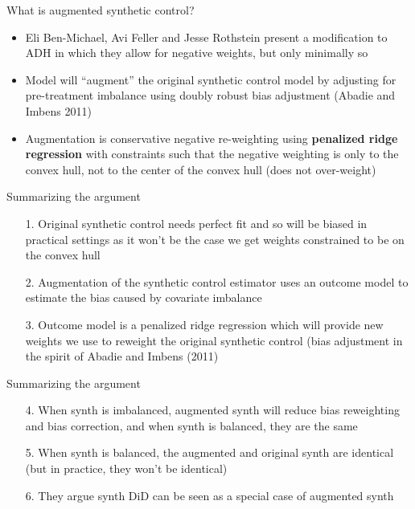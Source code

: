\documentclass{beamer}
\begin{document}
\begin{frame}{What is augmented synthetic control?}

\begin{itemize}
\item Eli Ben-Michael, Avi Feller and Jesse Rothstein present a modification to ADH in which they allow for negative weights, but only minimally so
\item Model will ``augment'' the original synthetic control model by adjusting for pre-treatment imbalance using doubly robust bias adjustment (Abadie and Imbens 2011)
\item Augmentation is conservative negative re-weighting using \textbf{penalized ridge regression} with constraints such that the negative weighting is only to the convex hull, not to the center of the convex hull (does not over-weight)
\end{itemize}

\end{frame}




\begin{frame}{Summarizing the argument}

\begin{enumerate}
\item[1. ] Original synthetic control needs perfect fit and so will be biased in practical settings as it won't be the case we get weights constrained to be  on the convex hull
\item[2. ] Augmentation of the synthetic control estimator uses an outcome model to estimate the bias caused by covariate imbalance 
\item[3. ] Outcome model is a penalized ridge regression which will provide new weights we use to reweight the original synthetic control (bias adjustment in the spirit of Abadie and Imbens (2011)
\end{enumerate}

\end{frame}


\begin{frame}{Summarizing the argument}

\begin{enumerate}
\item[4. ] When synth is imbalanced, augmented synth will reduce bias reweighting and bias correction, and when synth is balanced, they are the same
\item[5. ] When synth is balanced, the augmented and original synth are identical (but in practice, they won't be identical)
\item[6. ] They argue synth DiD can be seen as a special case of augmented synth
\end{enumerate}

\end{frame}
\end{document}
